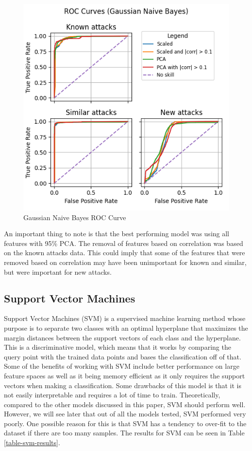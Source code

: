 \begin{figure}
    \centering
    \includegraphics[width=\linewidth]{figures/Gaussian Naive Bayes_roc_all_small.png}
    \caption{Gaussian Naive Bayes ROC Curve}
    \label{fig:gaus_roc}
\end{figure}

An important thing to note is that the best performing model was using all features with 95\% PCA. The removal of features based on correlation was based on the known attacks data. This could imply that some of the features that were removed based on correlation may have been unimportant for known and similar, but were important for new attacks.




\subsection{Support Vector Machines}
Support Vector Machines (SVM) is a supervised machine learning method whose purpose is to separate two classes with an optimal hyperplane that maximizes the margin distances between the support vectors of each class and the hyperplane. This is a discriminative model, which means that it works by comparing the query point with the trained data points and bases the classification off of that. Some of the benefits of working with SVM include better performance on large feature spaces as well as it being memory efficient as it only requires the support vectors when making a classification. Some drawbacks of this model is that it is not easily interpretable and requires a lot of time to train. Theoretically, compared to the other models discussed in this paper, SVM should perform well. However, we will see later that out of all the models tested, SVM performed very poorly. One possible reason for this is that SVM has a tendency to over-fit to the dataset if there are too many samples. The results for SVM can be seen in Table \ref{table-svm-results}.

